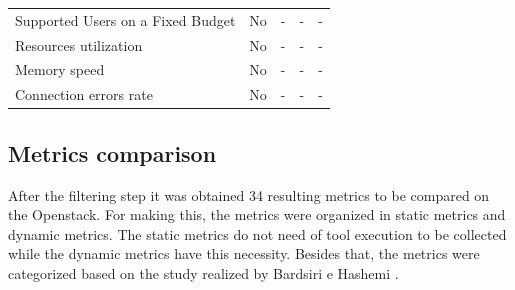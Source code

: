 \documentclass[conference]{IEEEtran}
\begin{document}
\begin{table}[]
\begin{tabular}{@{}lcccc@{}}
Supported Users on a Fixed Budget          & \cellcolor[HTML]{EA9999}No             & \cellcolor[HTML]{EA9999}-               & \cellcolor[HTML]{EA9999}-               & \cellcolor[HTML]{EA9999}-   \\
Resources utilization                            & \cellcolor[HTML]{EA9999}No             & \cellcolor[HTML]{EA9999}-               & \cellcolor[HTML]{EA9999}-               & \cellcolor[HTML]{EA9999}-   \\
Memory speed                             & \cellcolor[HTML]{EA9999}No             & \cellcolor[HTML]{EA9999}-               & \cellcolor[HTML]{EA9999}-               & \cellcolor[HTML]{EA9999}-   \\
Connection errors rate                          & \cellcolor[HTML]{EA9999}No             & \cellcolor[HTML]{EA9999}-               & \cellcolor[HTML]{EA9999}-               & \cellcolor[HTML]{EA9999}-   \\ \bottomrule
\end{tabular}
\end{table}
   
  \subsection{Metrics comparison} \label{confronto}
  
  
  After the filtering step it was obtained 34 resulting metrics to be compared on the Openstack. For making this, the metrics were organized in static metrics and dynamic metrics. The static metrics do not need of tool execution to be collected while the dynamic metrics have this necessity. Besides that, the metrics were categorized based on the study realized by Bardsiri e Hashemi \cite{bardsiri2014}. 
\end{document}
